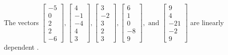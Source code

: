 \begin{exercise}
\begin{exerciseStatement}
  \end{exerciseStatement}
  \begin{exerciseAnswer}
   The vectors \(\left[\begin{array}{r}
-5 \\
0 \\
2 \\
2 \\
-6
\end{array}\right] , \left[\begin{array}{r}
4 \\
-1 \\
-4 \\
4 \\
3
\end{array}\right] , \left[\begin{array}{r}
3 \\
-2 \\
3 \\
2 \\
3
\end{array}\right] , \left[\begin{array}{r}
6 \\
1 \\
0 \\
-8 \\
9
\end{array}\right] , \text{ and } \left[\begin{array}{r}
9 \\
4 \\
-21 \\
-2 \\
9
\end{array}\right]\) are 
  	 linearly dependent  .
  


  \end{exerciseAnswer}
\end{exercise}